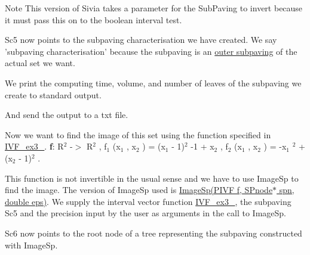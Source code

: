 \begin{DoxyNote}{\-Note}
\-This version of \-Sivia takes a parameter for the \-Sub\-Paving to invert because it must pass this on to the boolean interval test.
\end{DoxyNote}
\-Sc5 now points to the subpaving characterisation we have created. \-We say 'subpaving characterisation' because the subpaving is an \hyperlink{AIASubPavings_outerpaving}{outer subpaving} of the actual set we want.

\-We print the computing time, volume, and number of leaves of the subpaving we create to standard output.


\begin{DoxyCodeInclude}

\end{DoxyCodeInclude}


\-And send the output to a txt file.


\begin{DoxyCodeInclude}

\end{DoxyCodeInclude}


\-Now we want to find the image of this set using the function specified in \hyperlink{newsubpavings_NewIVF_ex3_4}{\-I\-V\-F\-\_\-ex3\-\_}. {\bfseries f}\-: \-R$^{\mbox{2}}$  -\/$>$ \-R$^{\mbox{2}}$ , f$_{\mbox{1}}$ (x$_{\mbox{1}}$ , x$_{\mbox{2}}$ ) = (x$_{\mbox{1}}$  -\/ 1)$^{\mbox{2}}$  -\/1 + x$_{\mbox{2}}$ , f$_{\mbox{2}}$ (x$_{\mbox{1}}$ , x$_{\mbox{2}}$ ) = -\/x$_{\mbox{1}}$ $^{\mbox{2}}$  + (x$_{\mbox{2}}$  -\/ 1)$^{\mbox{2}}$ .


\begin{DoxyCodeInclude}

\end{DoxyCodeInclude}


\-This function is not invertible in the usual sense and we have to use \-Image\-Sp to find the image. \-The version of \-Image\-Sp used is \hyperlink{classsubpavings_1_1SPnode_a5e79ff65a692b09c98ff53264ddfba9f}{\-Image\-Sp(\-P\-I\-V\-F f, S\-Pnode$\ast$ spn, double eps)}. \-We supply the interval vector function \hyperlink{newsubpavings_NewIVF_ex3_4}{\-I\-V\-F\-\_\-ex3\-\_}, the subpaving \-Sc5 and the precision input by the user as arguments in the call to \-Image\-Sp.


\begin{DoxyCodeInclude}

\end{DoxyCodeInclude}


\-Sc6 now points to the root node of a tree representing the subpaving constructed with \-Image\-Sp.

